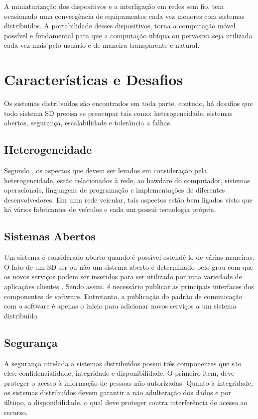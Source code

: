 \documentclass[
	12pt,				%
	oneside,			%
	a4paper,			%
	english,			%
	brazil				%
	]{abntex2ppgsi}
\begin{document}
A miniaturização dos dispositivos  e a interligação em redes sem fio, tem ocasionado uma convergência de equipamentos cada vez menores com sistemas distribuídos. A portabilidade desses dispositivos, torna a computação móvel possível e fundamental para que a computação ubíqua ou pervasiva seja utilizada cada vez mais pelo usuário e de maneira transparente e natural.

\section{Características e Desafios}

Os sistemas distribuídos são encontrados em toda parte, contudo, há desafios que todo sistema SD precisa se preocupar tais como: heterogeneidade, sistemas abertos,  segurança, escalabilidade e tolerância a falhas.

\subsection{Heterogeneidade}

Segundo , os aspectos que devem ser levados em consideração pela heterogeneidade, estão relacionados à rede, ao hawdare do computador, sistemas operacionais, linguagens de programação e implementações de diferentes desenvolvedores. Em uma rede veicular, tais aspectos estão bem ligados visto que há vários fabricantes de veículos e cada um possui tecnologia própria.

\subsection{Sistemas Abertos}

Um sistema é considerado aberto quando é possível estendê-lo de várias maneiras. O fato de um SD ser ou não um sistema aberto é determinado pelo grau com que os novos serviços podem ser inseridos para ser utilizado por uma variedade de aplicações clientes \cite{coulouris2013sistemas}. Sendo assim, é necessário publicar as principais interfaces dos componentes de software. Entretanto, a publicação do padrão de comunicação com o software é apenas o início para adicionar novos serviços a um sistema distribuído.

\subsection{Segurança}

A segurança atrelada a sistemas distribuídos possui três componentes que são eles: confidencialidade, integridade e disponibilidade. O primeiro item, deve proteger o acesso à informação de pessoas não autorizadas. Quanto à integridade, os sistemas distribuídos devem garantir a não adulteração dos dados e por último, a disponibilidade, o qual deve proteger contra interferência de acesso ao recurso.
\end{document}

